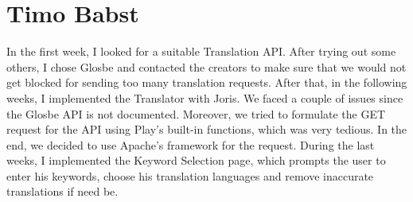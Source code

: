 \section{Timo Babst}

In the first week, I looked for a suitable Translation API. After trying out some others, I chose Glosbe and contacted the creators to make sure
that we would not get blocked for sending too many translation requests. After that, in the following weeks, I implemented the Translator with Joris.
We faced a couple of issues since the Glosbe API is not documented. Moreover, we tried to formulate the GET request for the API using
Play's built-in functions, which was very tedious. In the end, we decided to use Apache's framework for the request.
During the last weeks, I implemented the Keyword Selection page, which prompts the user to enter his keywords, choose his translation languages and remove
inaccurate translations if need be.




